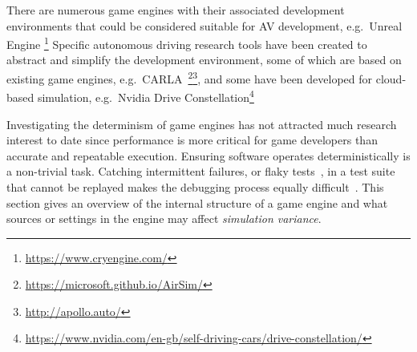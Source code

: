There are numerous game engines with their associated development environments that could be considered suitable for AV development, e.g.\ Unreal Engine
\DIFdelbegin {}\DIFdelend \DIFaddbegin {}\footnote{\url{https://www.cryengine.com/}} 
\DIFaddend Specific autonomous driving research tools have been created to abstract and simplify the development environment, some of which are based on existing game engines, e.g.\ CARLA~\DIFdelbegin {}\DIFdelend \DIFaddbegin {}\footnote{\url{https://microsoft.github.io/AirSim/}}\footnote{\url{http://apollo.auto/}}\DIFaddend , and some have been developed for cloud-based simulation, e.g.\ Nvidia Drive Constellation\DIFdelbegin {}\DIFdelend \DIFaddbegin \footnote{\url{https://www.nvidia.com/en-gb/self-driving-cars/drive-constellation/}}\DIFaddend 

Investigating the determinism of game engines has not attracted much research interest to date since performance is more critical for game developers than accurate and repeatable execution. Ensuring software operates deterministically is a non-trivial task.  Catching intermittent failures, or flaky tests~\cite{intermittently-failing-tests}, in a test suite that cannot be replayed makes the debugging process equally difficult~\cite{acm-q-rr-interview}. This section gives an overview of the internal structure of a game engine and what sources or settings in the engine may affect \textit{simulation variance}.

